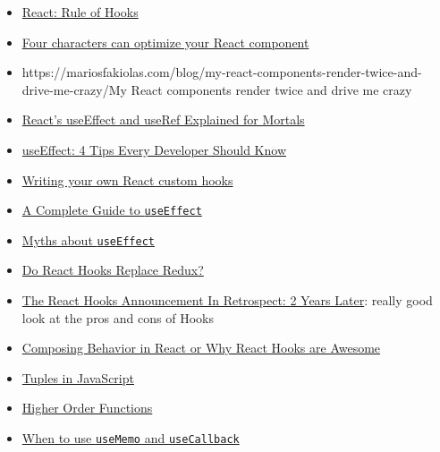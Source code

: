 \begin{itemize}[leftmargin=*]
    \item \href{http://reactjs.org/docs/hooks-rules.html}{React: Rule of Hooks}
    \item \href{https://www.benmvp.com/blog/four-characters-optimize-react-component/}{Four characters can optimize your React component}
    \item {https://mariosfakiolas.com/blog/my-react-components-render-twice-and-drive-me-crazy/}{My React components render twice and drive me crazy}
    \item \href{https://leewarrick.com/blog/react-use-effect-explained/}{React's useEffect and useRef Explained for Mortals}
    \item \href{https://medium.com/swlh/useeffect-4-tips-every-developer-should-know-54b188b14d9c}{useEffect: 4 Tips Every Developer Should Know}
    \item \href{https://tvernon.tech/blog/react-custom-hook-for-forms}{Writing your own React custom hooks}
    \item \href{https://overreacted.io/a-complete-guide-to-useeffect/}{A Complete Guide to \texttt{useEffect}}
    \item \href{https://epicreact.dev/myths-about-useeffect/}{Myths about \texttt{useEffect}}
    \item \href{https://medium.com/javascript-scene/do-react-hooks-replace-redux-210bab340672}{Do React Hooks Replace Redux?}
    \item \href{https://dev.to/ryansolid/the-react-hooks-announcement-in-retrospect-2-years-later-18lm}{The React Hooks Announcement In Retrospect: 2 Years Later}: really good look at the pros and cons of Hooks
    \item \href{https://www.youtube.com/watch?v=nUzLlHFVXx0}{Composing Behavior in React or Why React Hooks are Awesome}
    \item \href{https://medium.com/@ntgard/tuples-in-javascript-cd33321e5277}{Tuples in JavaScript}
    \item \href{https://eloquentjavascript.net/05_higher_order.html}{Higher Order Functions}
    \item \href{https://kentcdodds.com/blog/usememo-and-usecallback/}{When to use \texttt{useMemo} and \texttt{useCallback}}
\end{itemize}
